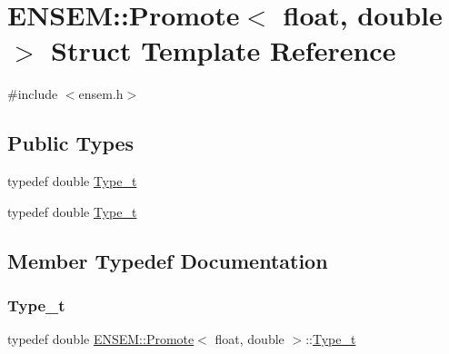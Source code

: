\hypertarget{structENSEM_1_1Promote_3_01float_00_01double_01_4}{}\section{E\+N\+S\+EM\+:\+:Promote$<$ float, double $>$ Struct Template Reference}
\label{structENSEM_1_1Promote_3_01float_00_01double_01_4}


{\ttfamily \#include $<$ensem.\+h$>$}

\subsection*{Public Types}
\begin{DoxyCompactItemize}
\item 
typedef double \mbox{\hyperlink{structENSEM_1_1Promote_3_01float_00_01double_01_4_a09b7701594759488b49b335572cbfb62}{Type\+\_\+t}}
\item 
typedef double \mbox{\hyperlink{structENSEM_1_1Promote_3_01float_00_01double_01_4_a09b7701594759488b49b335572cbfb62}{Type\+\_\+t}}
\end{DoxyCompactItemize}


\subsection{Member Typedef Documentation}
\mbox{\label{structENSEM_1_1Promote_3_01float_00_01double_01_4_a09b7701594759488b49b335572cbfb62}} 
\subsubsection{\texorpdfstring{Type\_t}{Type\_t}\hspace{0.1cm}{\footnotesize\ttfamily [1/2]}}
{\footnotesize\ttfamily typedef double \mbox{\hyperlink{structENSEM_1_1Promote}{E\+N\+S\+E\+M\+::\+Promote}}$<$ float, double $>$\+::\mbox{\hyperlink{structENSEM_1_1Promote_3_01float_00_01double_01_4_a09b7701594759488b49b335572cbfb62}{Type\+\_\+t}}}

\mbox{\label{structENSEM_1_1Promote_3_01float_00_01double_01_4_a09b7701594759488b49b335572cbfb62}} 
